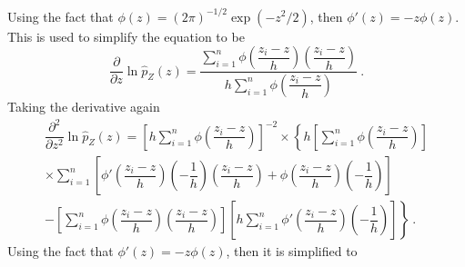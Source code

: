 Using the fact that $\phi(z)=(2\pi)^{-1/2}\exp(-z^2/2)$, then $\phi'(z)=-z\phi(z)$. This is used to simplify the equation to be
\begin{equation}
  \dfrac{
    \partial
  }
  {
    \partial z
  }
  \ln\widehat{p}_Z(z)
  =
  \dfrac{
    \sum_{i=1}^n
    \phi\left(
      \dfrac{
        z_i - z
      }
      {
        h
      }
    \right)
    \left(
      \dfrac{
        z_i - z
      }
      {
        h
      }
    \right)
  }
  {
    h
    \sum_{i=1}^n
    \phi\left(
      \dfrac{
        z_i - z
      }
      {
        h
      }
    \right)
  }
  \ .
\end{equation}
Taking the derivative again
\begin{multline}
  \dfrac{
    \partial^2
  }
  {
    \partial z^2
  }
  \ln\widehat{p}_Z(z)
  =
  \left[
    h\sum_{i=1}^n
    \phi\left(
      \dfrac{
        z_i-z
      }
      {
        h
      }
    \right)
  \right]^{-2}
  \times
  \left\{
    h\left[
      \sum_{i=1}^n
      \phi\left(
        \dfrac{
          z_i-z
        }
        {
          h
        }
      \right)
    \right]
  \right.
  \\
  \left.
    \times
    \sum_{i=1}^n\left[
      \phi'\left(
        \dfrac{
          z_i-z
        }
        {
          h
        }
      \right)
      \left(
        -\dfrac{
          1
        }
        {
          h
        }
      \right)
      \left(
        \dfrac{
          z_i-z
        }
        {
          h
        }
      \right)
      +\phi\left(
        \dfrac{
          z_i-z
        }
        {
          h
        }
      \right)
      \left(
        -\dfrac{
          1
        }
        {
          h
        }
      \right)
    \right]
  \right.
  \\
  \left.
    -
    \left[
      \sum_{i=1}^n
      \phi\left(
        \dfrac{
          z_i-z
        }
        {
          h
        }
      \right)
      \left(
        \dfrac{
          z_i-z
        }
        {
          h
        }
      \right)
    \right]
    \left[
      h\sum_{i=1}^n
      \phi'\left(
        \dfrac{
          z_i-z
        }
        {
          h
        }
      \right)
      \left(
        -\dfrac{
          1
        }
        {
          h
        }
      \right)
    \right]
  \right\}
  \ .
\end{multline}
Using the fact that $\phi'(z)=-z\phi(z)$, then it is simplified to
